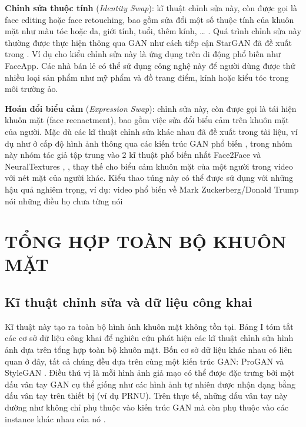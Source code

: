 \documentclass{article}
\begin{document}
\textbf{Chỉnh sửa thuộc tính} (\textit{Identity Swap}): kĩ thuật chỉnh sửa này, còn được gọi là face editing hoặc face retouching, bao gồm sửa đổi một số thuộc tính của khuôn mặt như màu tóc hoặc da, giới tính, tuổi, thêm kính, … . Quá trình chỉnh sửa này thường được thực hiện thông qua GAN như cách tiếp cận StarGAN đã đề xuất trong . Ví dụ cho kiểu chỉnh sửa này là ứng dụng trên di động phổ biến như FaceApp. Các nhà bán lẻ có thể sử dụng công nghệ này để người dùng được thử nhiều loại sản phẩm như mỹ phẩm và đồ trang điểm, kính hoặc kiểu tóc trong môi trường ảo.

\textbf{Hoán đổi biểu cảm} (\textit{Expression Swap}): chỉnh sửa này, còn được gọi là tái hiện khuôn mặt (face reenactment), bao gồm việc sửa đổi biểu cảm trên khuôn mặt của người. Mặc dù các kĩ thuật chỉnh sửa khác nhau đã đề xuất trong tài liệu, ví dụ như ở cấp độ hình ảnh thông qua các kiến trúc GAN phổ biến , trong nhóm này nhóm tác giả tập trung vào 2 kĩ thuật phổ biến nhất Face2Face và NeuralTextures , , thay thế cho biểu cảm khuôn mặt của một người trong video với nét mặt của người khác. Kiểu thao túng này có thể được sử dụng với những hậu quả nghiêm trọng, ví dụ: video phổ biến về Mark Zuckerberg/Donald Trump nói những điều họ chưa từng nói

\section{TỔNG HỢP TOÀN BỘ KHUÔN MẶT}

\subsection{Kĩ thuật chỉnh sửa và dữ liệu công khai}

Kĩ thuật này tạo ra toàn bộ hình ảnh khuôn mặt không tồn tại. Bảng I tóm tắt các cơ sở dữ liệu công khai để nghiên cứu phát hiện các kĩ thuật chỉnh sửa hình ảnh dựa trên tổng hợp toàn bộ khuôn mặt. Bốn cơ sở dữ liệu khác nhau có liên quan ở đây, tất cả chúng đều dựa trên cùng một kiến trúc GAN: ProGAN  và StyleGAN . Điều thú vị là mỗi hình ảnh giả mạo có thể được đặc trưng bởi một dấu vân tay GAN cụ thể giống như các hình ảnh tự nhiên được nhận dạng bằng dấu vân tay trên thiết bị (ví dụ PRNU). Trên thực tế, những dấu vân tay này dường như không chỉ phụ thuộc vào kiến trúc GAN mà còn phụ thuộc vào các instance khác nhau của nó   .
\end{document}

